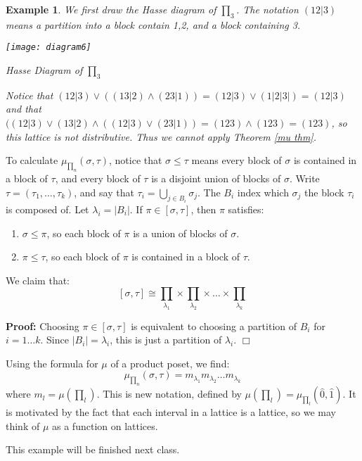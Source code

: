 \documentclass[11pt]{article}
\newtheorem{example}[theorem]{Example}
\newenvironment{proof}{\noindent \textbf{Proof:}}{$\Box$}
\begin{document}
\begin{example}
We first draw the Hasse diagram of $\prod_3$. The notation $(12|3)$ means a partition into a block contain 1,2, and a block containing 3. 
\begin{center}
\texttt{[image: diagram6]}

Hasse Diagram of $\prod_3$
\end{center}

Notice that $(12|3)\vee((13|2)\wedge(23|1))=(12|3)\vee(1|2|3|)=(12|3)$ and that $((12|3)\vee(13|2)\wedge((12|3)\vee (23|1))=(123)\wedge(123)=(123)$, so this lattice is not distributive. Thus we cannot apply Theorem \ref{mu thm}.
\end{example}

To calculate $\mu_{\prod_n}(\sigma,\tau)$, notice that $\sigma \le \tau$ means every block of $\sigma$ is contained in a block of $\tau$, and every block of $\tau$ is a disjoint union of blocks of $\sigma$. Write $\tau=(\tau_1, \ldots, \tau_k)$, and say that $\tau_i=\bigcup_{j\in B_i} \sigma_j$. The $B_i$ index which $\sigma_j$ the block $\tau_i$ is composed of. Let $\lambda_i=|B_i|$.  If $\pi\in [\sigma,\tau]$, then $\pi$ satisfies:
\begin{enumerate}
\item $\sigma\le \pi$, so each block of $\pi$ is a union of blocks of $\sigma$.
\item $\pi \le \tau$, so each block of $\pi$ is contained in a block of $\tau$.
\end{enumerate}

We claim that:
$$[\sigma,\tau]\cong \prod_{\lambda_1}\times \prod_{\lambda_2}\times \ldots \times \prod_{\lambda_k}$$

\begin{proof}
Choosing $\pi\in [\sigma,\tau]$ is equivalent to choosing a partition of $B_i$ for $i=1\ldots k$. Since $|B_i|=\lambda_i$, this is just a partition of $\lambda_i$.
\end{proof}

Using the formula for $\mu$ of a product poset, we find:
$$\mu_{\prod_n}(\sigma,\tau)=m_{\lambda_1}m_{\lambda_2} \ldots m_{\lambda_k}$$
where $m_{l}=\mu(\prod_l)$. This is new notation, defined by $\mu(\prod_l)=\mu_{\prod_l}(\hat{0},\hat{1})$. It is motivated by the fact that each interval in a lattice is a lattice, so we may think of $\mu$ as a function on lattices. 

This example will be finished next class.  
\end{document}
